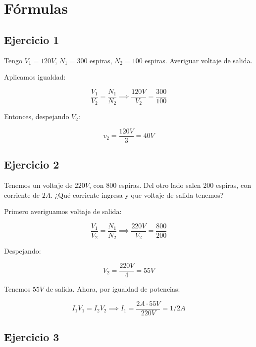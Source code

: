 \section{Fórmulas}

\subsection{Ejercicio 1}

Tengo \(V_1 = 120 V\), \(N_1 = 300\) espiras, \(N_2 = 100\) espiras.
Averiguar voltaje de salida.

Aplicamos igualdad:

\begin{equation*}
    \frac{V_1}{V_2} = \frac{N_1}{N_2} \implies \frac{120 V}{V_2} = \frac{300}{100}
\end{equation*}

Entonces, despejando \(V_2\):

\begin{equation*}
    v_2 = \frac{120 V}{3} = \boxed{40 V}
\end{equation*}

\subsection{Ejercicio 2}

Tenemos un voltaje de \(220V\),
con 800 espiras.
Del otro lado salen 200 espiras, con corriente de \(2 A\).
¿Qué corriente ingresa y que voltaje de salida tenemos?

Primero averiguamos voltaje de salida:

\begin{equation*}
    \frac{V_1}{V_2} = \frac{N_1}{N_2} \implies \frac{220V}{V_2} = \frac{800}{200}
\end{equation*}

Despejando:

\begin{equation*}
    V_2 = \frac{220V}{4} = \boxed{55V}
\end{equation*}

Tenemos \(55V\) de salida. Ahora, por igualdad de potencias:

\begin{equation*}
    I_1V_1 = I_2V_2 \implies I_1 = \frac{2 A\cdot55V}{220V} = \boxed{1/2 A}
\end{equation*}


\subsection{Ejercicio 3}


